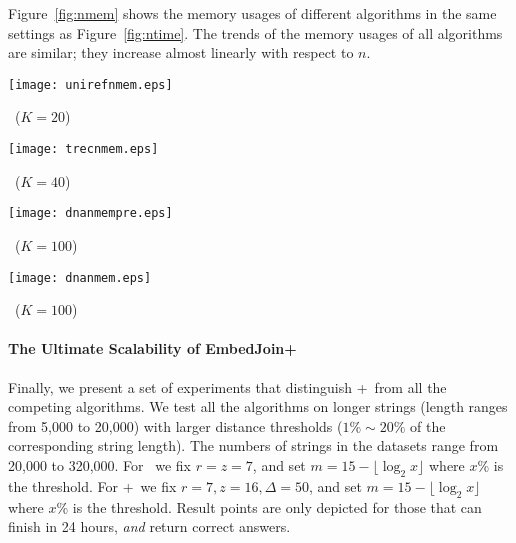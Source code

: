 Figure~\ref{fig:nmem} shows the memory usages of different algorithms in the same settings as Figure~\ref{fig:ntime}. The trends of the memory usages of all algorithms are similar; they increase almost linearly with respect to $n$. 





\begin{figure*}[t]
\centering
\begin{minipage}[d]{0.4\linewidth}
\centering
\texttt{[image: unirefnmem.eps]}
\centerline{\uniref\ ($K=20$)}
\end{minipage}
\begin{minipage}[d]{0.4\linewidth}
\centering
\texttt{[image: trecnmem.eps]}
\centerline{\trec\ ($K=40$)}
\end{minipage}
\begin{minipage}[d]{0.4\linewidth}
\centering
\texttt{[image: dnanmempre.eps]}
\centerline{\genoaa\ ($K=100$)}
\end{minipage}
\begin{minipage}[d]{0.4\linewidth}
\centering
\texttt{[image: dnanmem.eps]}
\centerline{\genoa\ ($K=100$)}
\end{minipage}
\caption{Memory usage, varying $n$.}
\label{fig:nmem}
\end{figure*}





\paragraph{The Ultimate Scalability of EmbedJoin+}   
Finally, we present a set of experiments that distinguish \ebdjoin+\ from all the competing algorithms. We test all the algorithms on longer strings (length ranges from 5,000 to 20,000) with larger distance thresholds ($1\% \sim 20\%$ of the corresponding string length).  The numbers of strings in the datasets range from 20,000 to 320,000.  For \ebdjoin\ we fix $r = z = 7$, and set $m= 15 - \lfloor \log_2 x \rfloor$ where $x \%$ is the threshold.  For \ebdjoin+\ we fix $r =  7,z = 16, \Delta = 50$, and set $m= 15 - \lfloor \log_2 x \rfloor$ where $x \%$ is the threshold.  Result points are only depicted for those that can finish in 24 hours, {\em and} return correct answers.  


